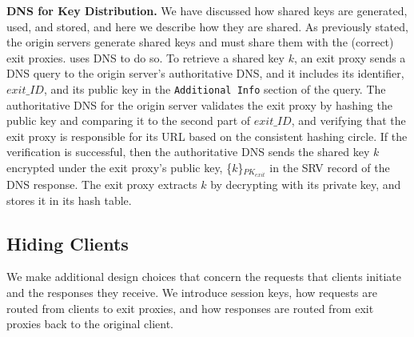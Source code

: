 \textbf{DNS for Key Distribution.}
We have discussed how shared keys are generated, used, and stored, and here we describe how they are shared.  As previously 
stated, the origin servers generate shared keys and must share them with the (correct) exit proxies.  \system{} uses DNS
to do so.  To retrieve a shared key $k$, an exit proxy sends a DNS query to the origin server's authoritative DNS, and 
it includes its identifier, $exit\_ID$, and its public key in the {\tt Additional Info} section of the query.  The 
authoritative DNS for the origin server validates the exit proxy by hashing the public key and comparing it to the 
second part of $exit\_ID$, and verifying that the exit proxy is responsible for its URL based on the consistent 
hashing circle.  If the verification is successful, then the authoritative DNS sends the shared key $k$ encrypted 
under the exit proxy's public key, \{$k$\}$_{PK_{exit}}$ in the SRV record of the DNS response.  The exit proxy 
extracts $k$ by decrypting with its private key, and stores it in its hash table.


\subsection{Hiding Clients}
\label{sec:hiding_clients}
We make additional design choices that concern the requests that clients initiate
and the responses they receive. We 
introduce session keys, how requests are routed from clients to exit proxies, and how responses 
are routed from exit proxies back to the original client.

